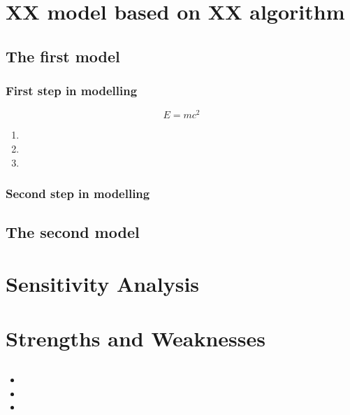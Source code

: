 \documentclass[12pt]{article}  %
\begin{document}
\section{XX model based on XX algorithm}  %


\subsection{The first model}  %
\subsubsection{First step in modelling} %

\begin{equation}  %
	E = mc^2 
	\label{aa}  %
\end{equation}  %
\begin{enumerate}  %
	\item	  %
	\item	
	\item 	
\end{enumerate}


\subsubsection{Second step in modelling} %


\subsection{The second model}  %




\section{Sensitivity Analysis}  %
   
\section{Strengths and Weaknesses}  %

\subsection{}  %
\begin{itemize}  %
	\item 
	\item 
	\item 
\end{itemize}
\end{document}
